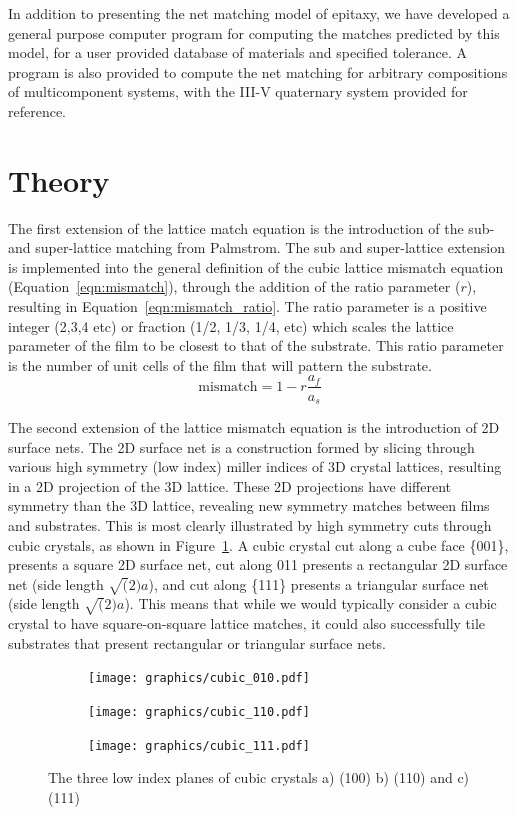 \documentclass[final,5p,times,twocolumn]{elsarticle}
\begin{document}
In addition to presenting the net matching model of epitaxy, we have developed a general purpose computer program for computing the matches predicted by this model, for a user provided database of materials and specified tolerance. A program is also provided to compute the net matching for arbitrary compositions of multicomponent systems, with the III-V quaternary system provided for reference.

\section{Theory}
The first extension of the lattice match equation is the introduction of the sub- and super-lattice matching from Palmstrom. The sub and super-lattice extension is implemented into the general definition of the cubic lattice mismatch equation (Equation~\ref{eqn:mismatch}), through the addition of the ratio parameter ($r$), resulting in Equation~\ref{eqn:mismatch_ratio}. The ratio parameter is a positive integer (2,3,4 etc) or fraction (1/2, 1/3, 1/4, etc) which scales the lattice parameter of the film to be closest to that of the substrate. This ratio parameter is the number of unit cells of the film that will pattern the substrate.
\begin{equation}
\text{mismatch} = 1 - r \frac{a_f}{a_s} \label{eqn:mismatch_ratio}
\end{equation}

The second extension of the lattice mismatch equation is the introduction of 2D surface nets. The 2D surface net is a construction formed by slicing through various high symmetry (low index) miller indices of 3D crystal lattices, resulting in a 2D projection of the 3D lattice. These 2D projections have different symmetry than the 3D lattice, revealing new symmetry matches between films and substrates. This is most clearly illustrated by high symmetry cuts through cubic crystals, as shown in Figure~\ref{fig:cubic_planes}. A cubic crystal cut along a cube face \{001\}, presents a square 2D surface net, cut along {011} presents a rectangular 2D surface net (side length $\sqrt(2)a$), and cut along \{111\} presents a triangular surface net (side length $\sqrt(2)a$). This means that while we would typically consider a cubic crystal to have square-on-square lattice matches, it could also successfully tile substrates that present rectangular or triangular surface nets.
\begin{figure}
    \centering
\begin{subfigure}{0.3\textwidth}
    \texttt{[image: graphics/cubic\_010.pdf]}
\end{subfigure}\quad
\begin{subfigure}{0.3\textwidth}
    \texttt{[image: graphics/cubic\_110.pdf]}
\end{subfigure}\quad
\begin{subfigure}{0.3\textwidth}
    \texttt{[image: graphics/cubic\_111.pdf]}
\end{subfigure}
    \caption{The three low index planes of cubic crystals a) (100) b) (110) and c) (111) \label{fig:cubic_planes}}
\end{figure}
\end{document}
